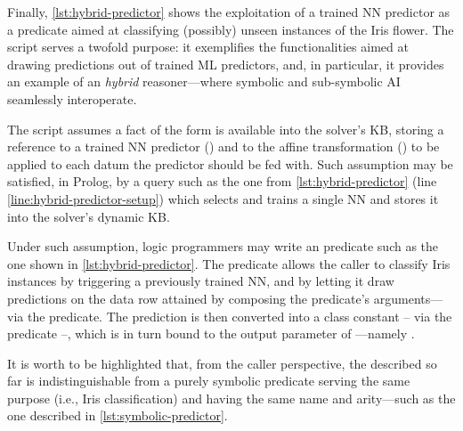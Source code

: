\documentclass{article}
\begin{document}
\prologimport[
    float,
    label={lst:hybrid-predictor},
    caption={Exploitation of the NN classifier trained in \cref{lst:training} to create an hybrid predicate} %
]{listings/hybrid-predictor.pl}

Finally, \cref{lst:hybrid-predictor} shows the exploitation of a trained NN predictor as a predicate aimed at classifying (possibly) unseen instances of the Iris flower.
%
The script serves a twofold purpose: it exemplifies the \mllib{} functionalities aimed at drawing predictions out of trained ML predictors, and, in particular, it provides an example of an \emph{hybrid} reasoner---where symbolic and sub-symbolic AI seamlessly interoperate.

The script assumes a fact of the form  is available into the solver's KB, storing a reference to a trained NN predictor () and to the affine transformation () to be applied to each datum the predictor should be fed with.
%
Such assumption may be satisfied, in Prolog, by a query such as the one from \cref{lst:hybrid-predictor} (line \ref{line:hybrid-predictor-setup}) which selects and trains a single NN and stores it into the solver's dynamic KB.

Under such assumption, logic programmers may write an  predicate such as the one shown in \cref{lst:hybrid-predictor}.
%
The predicate allows the caller to classify Iris instances by triggering a previously trained NN, and by letting it draw predictions on the data row attained by composing the predicate's arguments---via the  predicate.
%
The prediction is then converted into a class constant -- via the  predicate --, which is in turn bound to the output parameter of ---namely .

It is worth to be highlighted that, from the caller perspective, the  described so far is indistinguishable from a purely symbolic predicate serving the same purpose (i.e., Iris classification) and having the same name and arity---such as the one described in \cref{lst:symbolic-predictor}.


\end{document}
